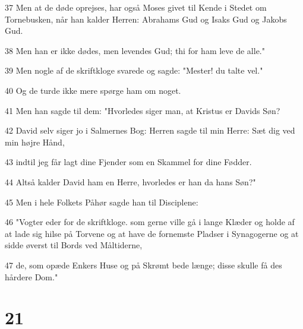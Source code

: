 \par 37 Men at de døde oprejses, har også Moses givet til Kende i Stedet om Tornebusken, når han kalder Herren: Abrahams Gud og Isaks Gud og Jakobs Gud.
\par 38 Men han er ikke dødes, men levendes Gud; thi for ham leve de alle."
\par 39 Men nogle af de skriftkloge svarede og sagde: "Mester! du talte vel."
\par 40 Og de turde ikke mere spørge ham om noget.
\par 41 Men han sagde til dem: "Hvorledes siger man, at Kristus er Davids Søn?
\par 42 David selv siger jo i Salmernes Bog: Herren sagde til min Herre: Sæt dig ved min højre Hånd,
\par 43 indtil jeg får lagt dine Fjender som en Skammel for dine Fødder.
\par 44 Altså kalder David ham en Herre, hvorledes er han da hans Søn?"
\par 45 Men i hele Folkets Påhør sagde han til Disciplene:
\par 46 "Vogter eder for de skriftkloge. som gerne ville gå i lange Klæder og holde af at lade sig hilse på Torvene og at have de fornemste Pladser i Synagogerne og at sidde øverst til Bords ved Måltiderne,
\par 47 de, som opæde Enkers Huse og på Skrømt bede længe; disse skulle få des hårdere Dom."

\chapter{21}

